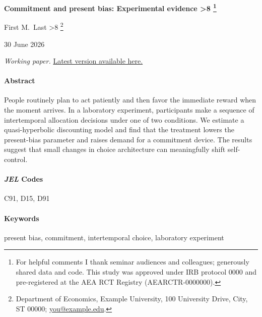 \documentclass[
    fontsize=12pt,fleqn,
    letterpaper,oneside,paper=portrait,
]{scrartcl}
\newcounter{savefootnote}
\newcounter{symfootnote}
\newcommand{\symfootnote}[1]{%
  \setcounter{savefootnote}{\value{footnote}}%
  \setcounter{footnote}{\value{symfootnote}}%
  \ifnum\value{footnote}>8\setcounter{footnote}{0}\fi%
  \let\oldthefootnote=\thefootnote%
  \renewcommand{\thefootnote}{\fnsymbol{footnote}}%
  \footnote{#1}%
  \let\thefootnote=\oldthefootnote%
  \setcounter{symfootnote}{\value{footnote}}%
  \setcounter{footnote}{\value{savefootnote}}%
}
\newcommand{\papertitle}{Commitment and present bias: Experimental evidence}
\newcommand{\paperauthor}{First M.~Last}
\newcommand{\paperdate}{30 June 2026}
\begin{document}

\thispagestyle{empty}

\vspace*{6pt}

\begin{center}%

\textbf{\sffamily\LARGE \papertitle\symfootnote{For helpful comments I thank
seminar audiences and colleagues; \textcite{RoeSmith2019} generously shared
data and code. This study was approved under IRB protocol 0000 and
pre-registered at the AEA RCT Registry (AEARCTR-0000000).}}

\vfill

{\large

\paperauthor\symfootnote{Department of Economics, Example University, 100
University Drive, City, ST 00000; \href{mailto:you@example.edu}{you@example.edu}.}

\vspace{\baselineskip}

\paperdate

\vspace{\baselineskip}

}

\textit{Working paper.} \href{https://example.com/paper.pdf}{Latest version available here.}

\end{center}%

\vfill
\vspace{-1\baselineskip}

\paragraph{Abstract}
People routinely plan to act patiently and then favor the immediate reward when
the moment arrives. In a laboratory experiment, participants make a sequence of
intertemporal allocation decisions under one of two conditions. We estimate a
quasi-hyperbolic discounting model and find that the treatment lowers the
present-bias parameter and raises demand for a commitment device. The results
suggest that small changes in choice architecture can meaningfully shift
self-control.

\vfill
\vspace{-1\baselineskip}

{\RaggedRight

\paragraph{\emph{JEL} Codes} C91, D15, D91

\paragraph{Keywords} present bias, commitment, intertemporal choice, laboratory experiment

}
\end{document}

